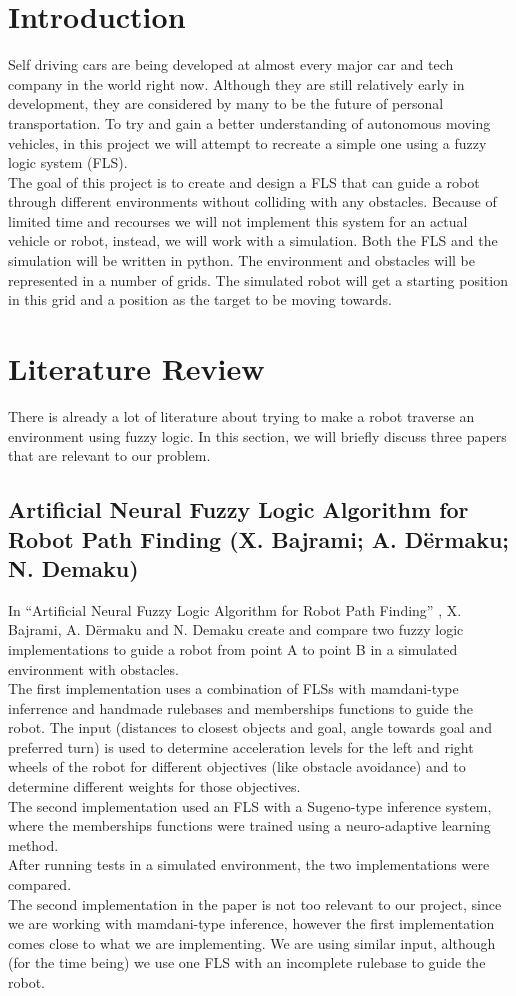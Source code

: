 \documentclass[conference]{IEEEtran}
\begin{document}
\section{Introduction}
Self driving cars are being developed at almost every major car and tech company in the world right now. Although they are still relatively early in development, they are considered by many to be the future of personal transportation. To try and gain a better understanding of autonomous moving vehicles, in this project we will attempt to recreate a simple one using a fuzzy logic system (FLS).\\
The goal of this project is to create and design a FLS that can guide a robot through different environments without colliding with any obstacles. Because of limited time and recourses we will not implement this system for an actual vehicle or robot, instead, we will work with a simulation. Both the FLS and the simulation will be written in python. The environment and obstacles will be represented in a number of grids. The simulated robot will get a starting position in this grid and a position as the target to be moving towards.


\section{Literature Review}
There is already a lot of literature about trying to make a robot traverse an environment using fuzzy logic. In this section, we will briefly discuss three papers that are relevant to our problem.

\subsection{Artificial Neural Fuzzy Logic Algorithm for Robot Path Finding (X. Bajrami; A. D\"ermaku; N. Demaku)}
In ``Artificial Neural Fuzzy Logic Algorithm for Robot Path Finding'' \cite{bajrami2015artificial}, X. Bajrami, A. D\"ermaku and N. Demaku create and compare two fuzzy logic implementations to guide a robot from point A to point B in a simulated environment with obstacles.\\
The first implementation uses a combination of FLSs with mamdani-type inferrence and handmade rulebases and memberships functions to guide the robot. The input (distances to closest objects and goal, angle towards goal and preferred turn) is used to determine acceleration levels for the left and right wheels of the robot for different objectives (like obstacle avoidance) and to determine different weights for those objectives.\\
The second implementation used an FLS with a Sugeno-type inference system, where the memberships functions were trained using a neuro-adaptive learning method.\\
After running tests in a simulated environment, the two implementations were compared.\\
The second implementation in the paper is not too relevant to our project, since we are working with mamdani-type inference, however the first implementation comes close to what we are implementing. We are using similar input, although (for the time being) we use one FLS with an incomplete rulebase to guide the robot.
\end{document}
